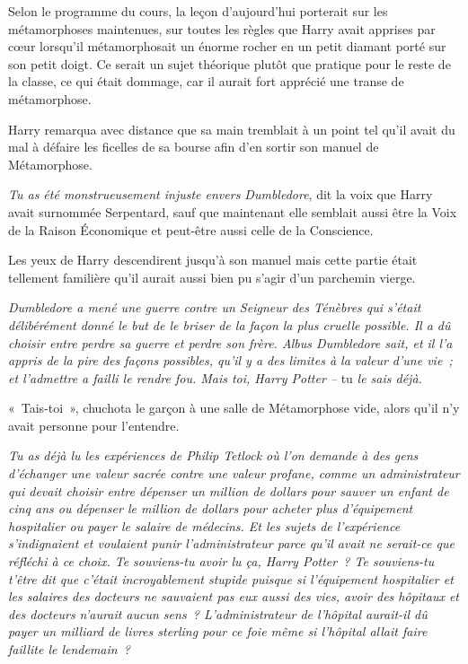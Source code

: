 Selon le programme du cours, la leçon d'aujourd'hui porterait sur les métamorphoses maintenues, sur toutes les règles que Harry avait apprises par cœur lorsqu'il métamorphosait un énorme rocher en un petit diamant porté sur son petit doigt.
Ce serait un sujet théorique plutôt que pratique pour le reste de la classe, ce qui était dommage, car il aurait fort apprécié une transe de métamorphose.

Harry remarqua avec distance que sa main tremblait à un point tel qu'il avait du mal à défaire les ficelles de sa bourse afin d'en sortir son manuel de Métamorphose.

\emph{Tu as été monstrueusement injuste envers Dumbledore}, dit la voix que Harry avait surnommée Serpentard, sauf que maintenant elle semblait aussi être la Voix de la Raison Économique et peut-être aussi celle de la Conscience.

Les yeux de Harry descendirent jusqu'à son manuel mais cette partie était tellement familière qu'il aurait aussi bien pu s'agir d'un parchemin vierge.

\emph{Dumbledore a mené une guerre contre un Seigneur des Ténèbres qui s'était délibérément donné le but de le briser de la façon la plus cruelle possible.
Il a dû choisir entre perdre sa guerre et perdre son frère.
Albus Dumbledore sait, et il l'a appris de la pire des façons possibles, qu'il y a des limites à la valeur d'une vie~; et l'admettre a failli le rendre fou.
Mais toi, Harry Potter --} tu \emph{le sais déjà.}

«~Tais-toi~», chuchota le garçon à une salle de Métamorphose vide, alors qu'il n'y avait personne pour l'entendre.

\emph{Tu as déjà lu les expériences de Philip Tetlock où l'on demande à des gens d'échanger une valeur sacrée contre une valeur profane, comme un administrateur qui devait choisir entre dépenser un million de dollars pour sauver un enfant de cinq ans ou dépenser le million de dollars pour acheter plus d'équipement hospitalier ou payer le salaire de médecins.
Et les sujets de l'expérience s'indignaient et voulaient punir l'administrateur parce qu'il avait ne serait-ce que réfléchi à ce choix.
Te souviens-tu avoir lu ça, Harry Potter~?
Te souviens-tu t'être dit que c'était incroyablement stupide puisque si l'équipement hospitalier et les salaires des docteurs ne sauvaient pas eux aussi des vies, avoir des hôpitaux et des docteurs n'aurait aucun sens~?
L'administrateur de l'hôpital aurait-il dû payer un milliard de livres sterling pour ce foie même si l'hôpital allait faire faillite le lendemain~?}

